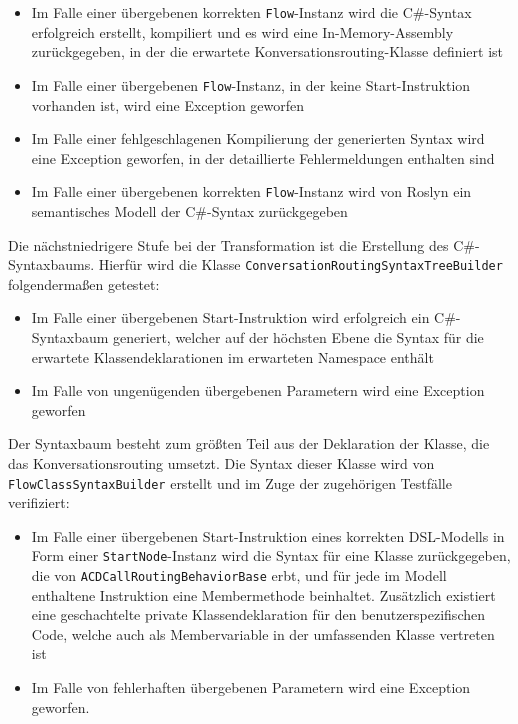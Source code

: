 \begin{itemize}
\item Im Falle einer übergebenen korrekten \texttt{Flow}-Instanz wird die C\#-Syntax erfolgreich erstellt, kompiliert und es wird eine In-Memory-Assembly zurückgegeben, in der die erwartete Konversationsrouting-Klasse definiert ist
\item Im Falle einer übergebenen \texttt{Flow}-Instanz, in der keine Start-Instruktion vorhanden ist, wird eine Exception geworfen
\item Im Falle einer fehlgeschlagenen Kompilierung der generierten Syntax wird eine Exception geworfen, in der detaillierte Fehlermeldungen enthalten sind
\item Im Falle einer übergebenen korrekten \texttt{Flow}-Instanz wird von Roslyn ein semantisches Modell der C\#-Syntax zurückgegeben
\end{itemize} 

\noindent Die nächstniedrigere Stufe bei der Transformation ist die Erstellung des C\#-Syntaxbaums. Hierfür wird die Klasse \texttt{ConversationRoutingSyntaxTreeBuilder} folgendermaßen getestet:

\begin{itemize}
\item Im Falle einer übergebenen Start-Instruktion wird erfolgreich ein C\#-Syn\-tax\-baum generiert, welcher auf der höchsten Ebene die Syntax für die erwartete Klassendeklarationen im erwarteten Namespace enthält
\item Im Falle von ungenügenden übergebenen Parametern wird eine Exception geworfen
\end{itemize}

\noindent Der Syntaxbaum besteht zum größten Teil aus der Deklaration der Klasse, die das Konversationsrouting umsetzt. Die Syntax dieser Klasse wird von \texttt{Flow\-Class\-Syn\-tax\-Buil\-der} erstellt und im Zuge der zugehörigen Testfälle verifiziert:

\begin{itemize}
\item Im Falle einer übergebenen Start-Instruktion eines korrekten DSL-Modells in Form einer \texttt{StartNode}-Instanz wird die Syntax für eine Klasse zurückgegeben, die von \texttt{ACDCallRoutingBehaviorBase} erbt, und für jede im Modell enthaltene Instruktion eine Membermethode beinhaltet. Zusätzlich existiert eine geschachtelte private Klassendeklaration für den benutzerspezifischen Code, welche auch als Membervariable in der umfassenden Klasse vertreten ist
\item Im Falle von fehlerhaften übergebenen Parametern wird eine Exception geworfen.
\end{itemize}

